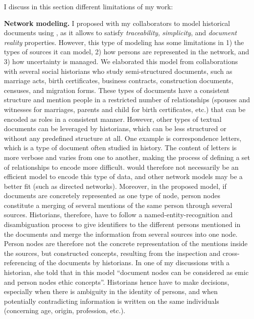 I discuss in this section different limitations of my work:

\noindent\textbf{Network modeling.} I proposed with my collaborators to model historical documents using \modelplural, as it allows to satisfy \emph{traceability}, \emph{simplicity}, and \emph{document reality} properties. However, this type of modeling has some limitations in 1) the types of sources it can model, 2) how persons are represented in the network, and 3) how uncertainty is managed.
We elaborated this model from collaborations with several social historians who study semi-structured documents, such as marriage acts, birth certificates, business contracts, construction documents, censuses, and migration forms.
These types of documents have a consistent structure and mention people in a restricted number of relationships (spouses and witnesses for marriages, parents and child for birth certificates, etc.) that can be encoded as roles in a consistent manner.
However, other types of textual documents can be leveraged by historians, which can be less structured or without any predefined structure at all.
One example is correspondence letters, which is a type of document often studied in history\cite{rollingerCicerosSupplicatioUnd2017, edelsteinHistoricalResearchDigital2017}.
The content of letters is more verbose and varies from one to another, making the process of defining a set of relationships to encode more difficult.
\modelpluralcapital would therefore not necessarily be an efficient model to encode this type of data, and other network models may be a better fit (such as directed networks).
Moreover, in the proposed model, if documents are concretely represented as one type of node, person nodes constitute a merging of several mentions of the same person through several sources.
Historians, therefore, have to follow a named-entity-recognition and disambiguation process to give identifiers to the different persons mentioned in the documents and merge the information from several sources into one node.
Person nodes are therefore not the concrete representation of the mentions inside the sources, but constructed concepts, resulting from the inspection and cross-referencing of the documents by historians.
In one of my discussions with a historian, she told that in this model ``document nodes can be considered as emic and person nodes ethic concepts''\cite{headlandEmicsEticsInsider1990}.
Historians hence have to make decisions, especially when there is ambiguity in the identity of persons, and when potentially contradicting information is written on the same individuals (concerning age, origin, profession, etc.).
